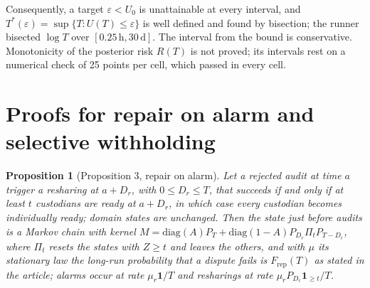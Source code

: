 \documentclass[11pt]{article}
\newtheorem*{propositionS}{Proposition}
\begin{document}
\noindent Consequently, a target $\varepsilon<U_0$ is unattainable at every interval, and $T^{*}(\varepsilon)=\sup\{T:U(T)\le\varepsilon\}$ is well defined and found by bisection; the runner bisected $\log T$ over $[0.25\,\mathrm{h},30\,\mathrm{d}]$. The interval from the bound is conservative. Monotonicity of the posterior risk $R(T)$ is not proved; its intervals rest on a numerical check of 25 points per cell, which passed in every cell.

\section{Proofs for repair on alarm and selective withholding}

\begin{propositionS}[Proposition 3, repair on alarm]
Let a rejected audit at time $a$ trigger a resharing at $a+D_r$, with $0\le D_r\le T$, that succeeds if and only if at least $t$ custodians are ready at $a+D_r$, in which case every custodian becomes individually ready; domain states are unchanged. Then the state just before audits is a Markov chain with kernel $M=\mathrm{diag}(A)P_T+\mathrm{diag}(1-A)P_{D_r}\Pi_t P_{T-D_r}$, where $\Pi_t$ resets the states with $Z\ge t$ and leaves the others, and with $\mu$ its stationary law the long-run probability that a dispute fails is $F_{\mathrm{rep}}(T)$ as stated in the article; alarms occur at rate $\mu_r\mathbf{1}/T$ and resharings at rate $\mu_rP_{D_r}\mathbf{1}_{\ge t}/T$.
\end{propositionS}
\end{document}
